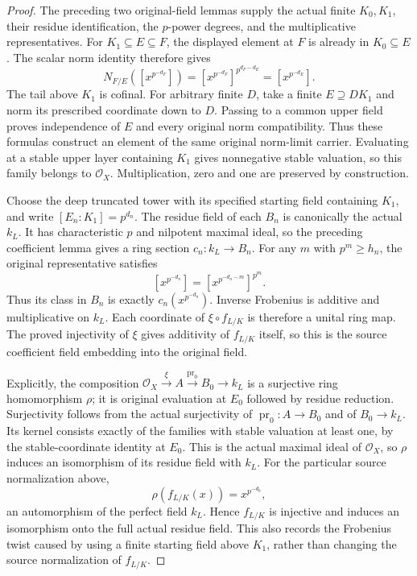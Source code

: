 \begin{proof}
The preceding two original-field lemmas supply the actual finite
$K_0,K_1$, their residue identification, the $p$-power degrees, and
the multiplicative representatives. For $K_1\subseteq E\subseteq F$,
the displayed element at $F$ is already in $K_0\subseteq E$.
The scalar norm identity therefore gives
\[
 N_{F/E}([x^{p^{-d_F}}])
 =[x^{p^{-d_F}}]^{p^{d_F-d_E}}=[x^{p^{-d_E}}].
\]
The tail above $K_1$ is cofinal. For arbitrary finite $D$, take a
finite $E\supseteq DK_1$ and norm its prescribed coordinate down to
$D$. Passing to a common upper field proves independence of $E$
and every original norm compatibility. Thus these formulas construct
an element of the same original norm-limit carrier. Evaluating at a
stable upper layer containing $K_1$ gives nonnegative stable valuation,
so this family belongs to $\mathcal O_X$. Multiplication, zero and one
are preserved by construction.

Choose the deep truncated tower with its specified starting field
containing $K_1$, and write $[E_n:K_1]=p^{d_n}$.
The residue field of each $B_n$ is canonically the actual $k_L$.
It has characteristic $p$ and nilpotent maximal ideal, so the preceding
coefficient lemma gives a ring section $c_n:k_L\to B_n$.
For any $m$ with $p^m\geq h_n$, the original representative satisfies
\[
 [x^{p^{-d_n}}]=[x^{p^{-d_n-m}}]^{p^m}.
\]
Thus its class in $B_n$ is exactly $c_n(x^{p^{-d_n}})$.
Inverse Frobenius is additive and multiplicative on $k_L$.
Each coordinate of $\xi\circ f_{L/K}$ is therefore a unital ring map.
The proved injectivity of $\xi$ gives additivity of $f_{L/K}$ itself,
so this is the source coefficient field embedding into the original field.

Explicitly, the composition
$\mathcal O_X\xrightarrow{\xi}A\xrightarrow{\operatorname{pr}_0}B_0\to k_L$
is a surjective ring homomorphism $\rho$; it is original evaluation at
$E_0$ followed by residue reduction. Surjectivity follows from the actual
surjectivity of $\operatorname{pr}_0:A\to B_0$ and of $B_0\to k_L$.
Its kernel consists exactly of the families with stable valuation at
least one, by the stable-coordinate identity at $E_0$.
This is the actual maximal ideal of $\mathcal O_X$, so $\rho$ induces
an isomorphism of its residue field with $k_L$.
For the particular source normalization above,
\[
 \rho(f_{L/K}(x))=x^{p^{-d_0}},
\]
an automorphism of the perfect field $k_L$.
Hence $f_{L/K}$ is injective and induces an isomorphism onto the full
actual residue field. This also records the Frobenius twist caused by
using a finite starting field above $K_1$, rather than changing the
source normalization of $f_{L/K}$.
\end{proof}

